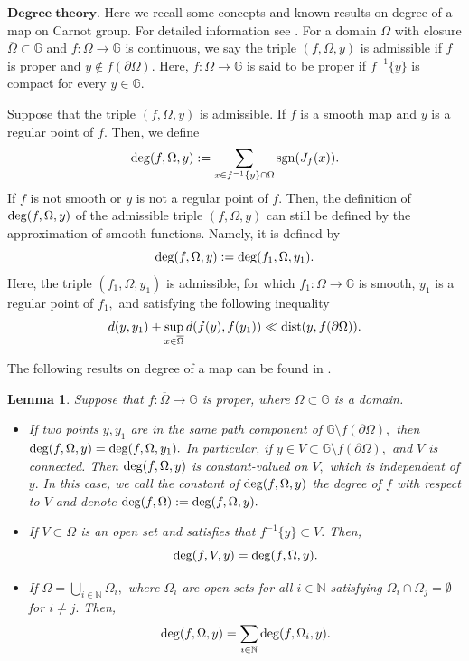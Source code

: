 \documentclass[11pt,twoside]{article}
\newtheorem{lem}[thm]{Lemma}
\theoremstyle{definition}
\theoremstyle{remark}
\begin{document}
$\mathbf{Degree\;theory}.$  Here we recall some concepts and known results on degree of a map on Carnot group. For detailed information see  \cite{Fed69, FG95, OR09}. For a domain $\Omega$ with closure $\overline{\Omega}\subset\mathbb{G}$ and $f:\Omega\rightarrow\mathbb{G}$ is continuous, we say the  triple $(f,\Omega,y)$ is admissible if $f$ is proper and $y\notin f(\partial\Omega).$ Here,  $f:\Omega\rightarrow\mathbb{G}$ is said to be proper if $f^{-1}\{y\}$ is compact for every $y\in\mathbb{G}.$

Suppose that the   triple $(f,\Omega,y)$ is admissible. If $f$ is a smooth map and $y$ is a regular point of $f.$ Then, we define 
$${\rm deg}(f,\Omega,y):=\sum_{x\in f^{-1}\{y\}\cap\Omega}{\rm sgn}(J_{f}(x)).$$
If $f$ is not smooth or $y$ is not a regular point of $f.$ Then, the definition of  ${\rm deg}(f,\Omega,y)$ of the admissible   triple $(f,\Omega,y)$  can still be defined by the approximation of smooth functions. Namely, it is  defined by 
$${\rm deg}(f,\Omega,y):={\rm deg}(f_{1},\Omega,y_{1}).$$
Here, the  triple $(f_{1},\Omega,y_{1})$ is admissible, for which $f_{1}:\Omega\rightarrow\mathbb{G}$ is smooth, $y_{1}$ is a regular point of $f_{1},$ and satisfying the following inequality
$$d(y,y_{1})+\sup _{x\in \overline{\Omega}}d(f(y),f(y_{1}))\ll {\rm dist}(y,f(\partial\Omega)).$$

The following results on degree of a map can be found in \cite{Fed69, FG95, OR09}.
\begin{lem}\label{lem2.1}
Suppose that $f:\overline{\Omega}\rightarrow\mathbb{G}$ is proper, where $\Omega\subset\mathbb{G}$ is a domain.
\begin{itemize}
\item  If two points $y,y_{1}$ are in the same path component of $\mathbb{G}\setminus f(\partial\Omega),$ then ${\rm deg}(f,\Omega,y)={\rm deg}(f,\Omega,y_{1}).$ In particular,  if $y\in V\subset\mathbb{G}\setminus f(\partial\Omega),$ and $V$ is connected. Then ${\rm deg}(f,\Omega,y)$  is constant-valued on $V,$ which is independent of $y.$  In this case,  we call the constant of ${\rm deg}(f,\Omega,y)$ the degree of $f$
    with respect to $V$ and  denote ${\rm deg}(f,\Omega):={\rm deg}(f,\Omega,y).$ 
\item If $V\subset\Omega$ is an open set and satisfies that $f^{-1}\{y\}\subset V.$ Then, $${\rm deg}(f,V,y)={\rm deg}(f,\Omega,y).$$ 
\item  If $\Omega=\bigcup_{i\in \mathbb{N}}\Omega_{i},$ where $\Omega_{i}$ are open sets for all $i\in \mathbb{N}$ satisfying $\Omega_{i}\cap \Omega_{j}=\emptyset$ for $i\neq j.$ Then,
$${\rm deg}(f,\Omega,y)=\sum_{i\in \mathbb{N}}{\rm deg}(f,\Omega_{i},y).$$
\end{itemize}
\end{lem}
\end{document}
